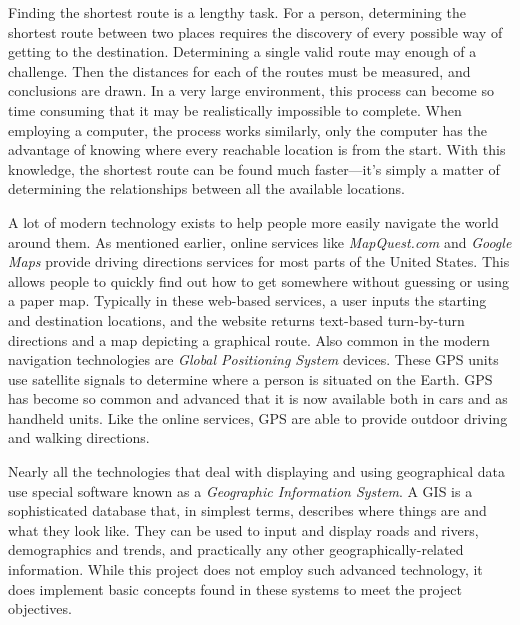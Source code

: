 \documentclass[12pt,letterpaper,titlepage]{article}   %
\begin{document}
Finding the shortest route is a lengthy task. For a person, determining
the shortest route between two places requires the discovery of every
possible way of getting to the destination. Determining a single valid
route may enough of a challenge. Then the distances for each of the
routes must be measured, and conclusions are drawn. In a very large
environment, this process can become so time consuming that it may be
realistically impossible to complete. When employing a computer, the
process works similarly, only the computer has the advantage of knowing
where every reachable location is from the start. With this knowledge,
the shortest route can be found much faster---it's simply a matter of
determining the relationships between all the available locations.

A lot of modern technology exists to help people more easily navigate
the world around them. As mentioned earlier, online services like
\emph{MapQuest.com} and \emph{Google Maps} provide driving directions
services for
most parts of the United States. This allows people to quickly find out
how to get somewhere without guessing or using a paper map. Typically in
these web-based services, a user inputs the starting and destination
locations, and the website returns text-based turn-by-turn directions
and a map depicting a graphical route. Also common in the modern
navigation technologies are \emph{Global Positioning System} devices. These GPS
units use satellite signals to determine where a person is situated on
the Earth. GPS has become so common and advanced that it is now
available both in cars and as handheld units. Like the online services,
GPS are able to provide outdoor driving and walking directions.

Nearly all the technologies that deal with displaying and using
geographical data use special software known as a \emph{Geographic Information
System}. A GIS is a sophisticated database that, in simplest terms,
describes where things are and what they look like. They can be used to
input and display roads and rivers, demographics and trends, and
practically any other geographically-related information. While this
project does not employ such advanced technology, it does implement
basic concepts found in these systems to meet the project objectives.
\cite{wiki:gis}
\end{document}
